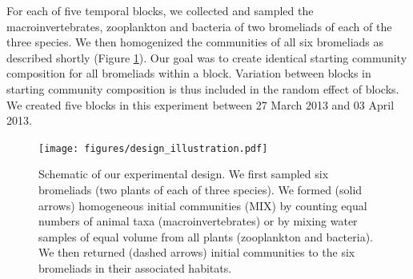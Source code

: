 For each of five temporal blocks, we collected and sampled the
macroinvertebrates, zooplankton and bacteria of two bromeliads of each
of the three species. We then homogenized the communities of all six
bromeliads as described shortly (Figure \ref{fig:schematic}). Our goal was to create
identical starting community composition for all bromeliads within a
block. Variation between blocks in starting community composition is
thus included in the random effect of blocks. We created five blocks in
this experiment between 27 March 2013 and 03 April 2013.

\begin{figure}[htbp]
\centering
\texttt{[image: figures/design\_illustration.pdf]}
\caption[Schematic of experimental design.]{Schematic of our experimental design. We first sampled six bromeliads (two plants of each of three species). We formed (solid
arrows) homogeneous initial communities (MIX) by counting equal numbers
of animal taxa (macroinvertebrates) or by mixing water samples of equal
volume from all plants (zooplankton and bacteria). We then returned
(dashed arrows) initial communities to the six bromeliads in their
associated habitats.}
\label{fig:schematic}
\end{figure}

